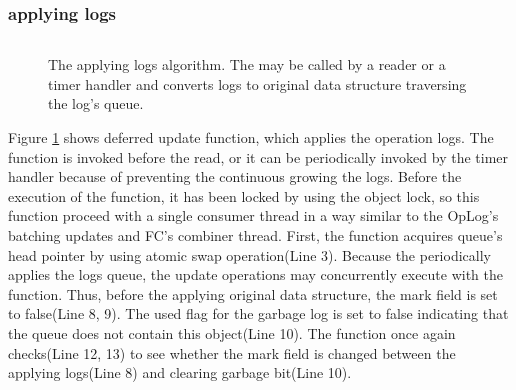 \subsubsection{applying logs}

\begin{figure}[h]
\begin{center}
\inputminted[linenos,fontsize=\footnotesize, tabsize=2]{c}{src/ldu_physical.c}
\end{center}
\caption{The \LDU applying logs algorithm. The  may be
 called by a reader or a timer handler and converts logs to original data structure
 traversing the log's queue.}
\label{fig:glduphysicalupdate}
\end{figure}



Figure \ref{fig:glduphysicalupdate} shows deferred update function, which
applies the operation logs.
The  function is invoked before the read, or it can be
periodically invoked by the timer handler because of preventing the continuous
growing the logs.
Before the execution of the  function, it has been locked by using
the object lock, so this function proceed with a single consumer thread
in a way similar to the OpLog's batching updates and FC's combiner thread.
First, the  function acquires queue's head pointer by using atomic swap
operation(Line 3).
Because the \LDU periodically applies the logs queue, the \LDU update operations may 
concurrently execute with the  function.
Thus, before the applying original data structure, the mark field is
set to false(Line 8, 9).
The used flag for the garbage log is set to false indicating that the queue
does not contain this object(Line 10).
The  function
once again checks(Line 12, 13) to see whether the mark field
is changed between the applying logs(Line 8) and clearing garbage bit(Line 10).

